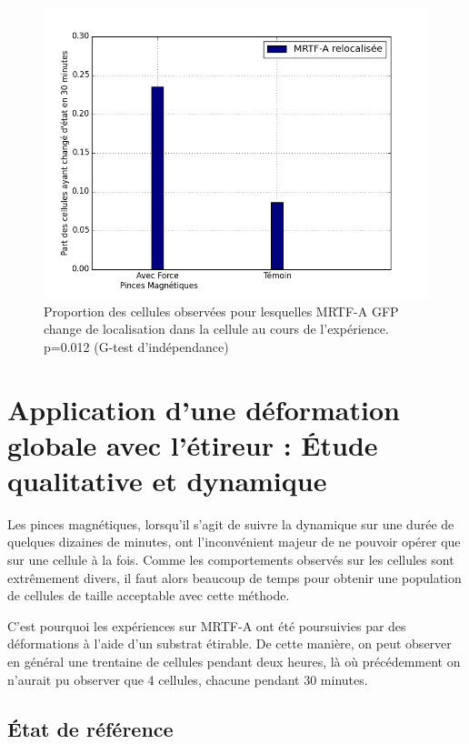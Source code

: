 \begin{figure}
\includegraphics[scale=0.4]{Figures/Pinces_vs_temoin.png} 
\caption{\label{pinces_vs_temoin} Proportion des cellules observées pour lesquelles MRTF-A GFP change de localisation dans la cellule au cours de l'expérience. p=0.012 (G-test d'indépendance)}
\end{figure}




\section{Application d'une déformation globale avec l'étireur : \'Etude qualitative et dynamique}

Les pinces magnétiques, lorsqu'il s'agit de suivre la dynamique sur une durée de quelques dizaines de minutes, ont l'inconvénient majeur de ne pouvoir opérer que sur une cellule à la fois. Comme les comportements observés sur les cellules sont extrêmement divers, il faut alors beaucoup de temps pour obtenir une population de cellules de taille acceptable avec cette méthode. 

C'est pourquoi les expériences sur MRTF-A ont été poursuivies par des déformations à l'aide d'un substrat étirable. De cette manière, on peut observer en général une trentaine de cellules pendant deux heures, là où précédemment on n'aurait pu observer que 4 cellules, chacune pendant 30 minutes. 



\subsection{\'Etat de référence}

